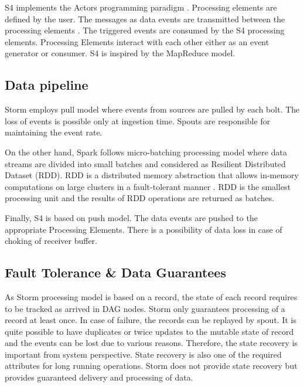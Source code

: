 \documentclass{acm_proc_article-sp}
\begin{document}
S4 implements the Actors programming paradigm \cite{gdfm:S4vsStorm:Online}. Processing elements are defined by the user. The messages as data events are transmitted between the processing elements \cite{Neumeyer:2010:SDS:1933306.1934385}. The triggered events are consumed by the S4 processing elements. Processing Elements interact with each other either as an event generator or consumer. S4 is inspired by the  MapReduce model.    
 

\subsection{Data pipeline}

Storm employs pull model where events from sources are pulled by each bolt. The loss of events is possible only at ingestion time. Spouts are responsible for maintaining the event rate.  

On the other hand, Spark follows micro-batching processing model where  data streams are divided into  small batches and considered as Resilient Distributed Dataset (RDD). RDD is a distributed memory abstraction that allows in-memory computations on large clusters in a fault-tolerant manner \cite{Zaharia:2012:RDD:2228298.2228301}. RDD is the smallest processing unit and the results of RDD operations are returned as batches.

Finally, S4 is based on push model. The data events are pushed to the appropriate Processing Elements. There is a possibility of data loss in case of choking of receiver buffer.








\subsection{Fault Tolerance \& Data Guarantees}

As Storm processing model is based on a record, the state of  each record requires to be tracked as arrived in DAG nodes. Storm only guarantees processing of a record at least once. In case of failure, the records can be replayed by spout. It is quite possible to have duplicates or twice updates to the mutable state of record and the events can be lost due to various reasons. Therefore, the state recovery is important from system perspective. State recovery is also one of the required attributes  for long running operations. Storm does not provide state recovery but provides guaranteed delivery and processing of data.
\end{document}
